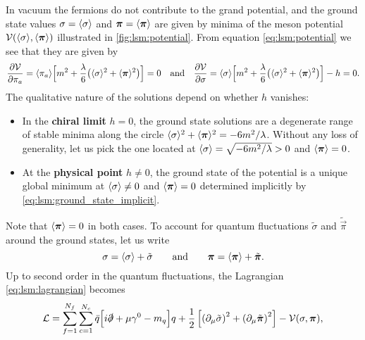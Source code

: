 In vacuum the fermions do not contribute to the grand potential,
and the ground state values $\sigma = \langle \sigma \rangle$ and ${\bm{\pi}} = \langle {\bm{\pi}} \rangle$ are given by minima of the meson potential $\mathcal{V}(\langle \sigma \rangle,\langle {\bm{\pi}} \rangle)$ illustrated in \cref{fig:lsm:potential}.
From equation \eqref{eq:lsm:potential} we see that they are given by
\begin{equation}
	\pdv{\mathcal{V}}{\pi_a} = \langle \pi_a \rangle \Big[ m^2 + \frac{\lambda}{6} \big(\langle \sigma \rangle^2 + \langle {\bm{\pi}} \rangle^2\big) \Big] = 0
	\quad \text{and} \quad
	\pdv{\mathcal{V}}{\sigma} = \langle \sigma \rangle \Big[ m^2 + \frac{\lambda}{6} \big(\langle \sigma \rangle^2 + \langle {\bm{\pi}} \rangle^2\big) \Big] - h = 0.
\label{eq:lsm:ground_state_implicit}
\end{equation}
The qualitative nature of the solutions depend on whether $h$ vanishes:
\begin{itemize}
\item In the \textbf{chiral limit} $h=0$,
      the ground state solutions are a degenerate range of stable minima along the circle $\langle \sigma \rangle^2+\langle {\bm{\pi}} \rangle^2=-6m^2/\lambda$.
      Without any loss of generality, let us pick the one located at $\langle \sigma \rangle = \sqrt{-6m^2/\lambda}>0$ and $\langle {\bm{\pi}} \rangle=0$.
\item At the \textbf{physical point} $h \neq 0$,
      the ground state of the potential is a unique global minimum at $\langle \sigma \rangle \neq 0$ and $\langle {\bm{\pi}} \rangle=0$ determined implicitly by \eqref{eq:lsm:ground_state_implicit}.
\end{itemize}
Note that $\langle {\bm{\pi}} \rangle = 0$ in both cases.
To account for quantum fluctuations $\tilde{\sigma}$ and $\tilde{\vec{\pi}}$ around the ground states, let us write
\begin{equation}
	\sigma = \langle \sigma \rangle + \tilde{\sigma}
	\qquad \text{and} \qquad
	{\bm{\pi}} = \langle {\bm{\pi}} \rangle + \tilde{{\bm{\pi}}}.
\end{equation}
Up to second order in the quantum fluctuations,
the Lagrangian \eqref{eq:lsm:lagrangian} becomes
\begin{equation}
	\lagr = \sum_{f=1}^{N_f} \sum_{c=1}^{N_c} \bar{q} \Big[ i \slashed\partial + \mu \gamma^0 - m_q \Big] q
	      + \frac12 \left[ \left( \partial_\mu \tilde{\sigma} \right)^2 + \left( \partial_\mu \tilde{\vec\pi} \right)^2 \right] - \pot(\sigma,\vec\pi) , %
\end{equation}
